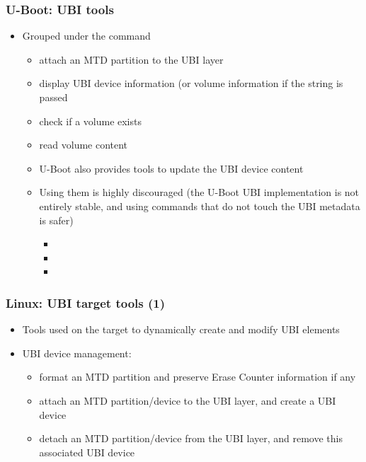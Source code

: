\begin{frame}
  \frametitle{U-Boot: UBI tools}
  \begin{itemize}
  \item Grouped under the  command
    \begin{itemize}
    \item {} attach an MTD partition to the UBI
      layer
    \item {} display UBI device information (or
      volume information if the  string is passed
    \item {} check if a volume exists
    \item {} read volume
      content
    \item U-Boot also provides tools to update the UBI device content
    \item Using them is highly discouraged (the U-Boot UBI implementation
      is not entirely stable, and using commands that do not touch the UBI
      metadata is safer)
      \begin{itemize}
      \item {}
      \item {}
      \item {}
      \end{itemize}
    \end{itemize}
  \end{itemize}
\end{frame}

\begin{frame}
  \frametitle{Linux: UBI target tools (1)}
  \begin{itemize}
  \item Tools used on the target to dynamically create and modify
      UBI elements
  \item UBI device management:
    \begin{itemize}
    \item {} format an MTD partition and
      preserve Erase Counter information if any
    \item {} attach an
      MTD partition/device to the UBI layer, and create a UBI device
    \item {} detach an
      MTD partition/device from the UBI layer, and remove this associated
      UBI device
    \end{itemize}
  \end{itemize}
\end{frame}

